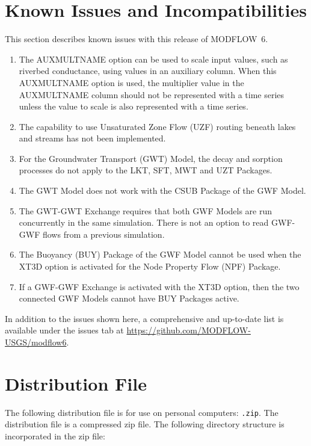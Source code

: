 \documentclass[11pt,twoside,twocolumn]{usgsreport}
\begin{document}
\section{Known Issues and Incompatibilities}
This section describes known issues with this release of MODFLOW~6.  

\begin{enumerate}

\item
The AUXMULTNAME option can be used to scale input values, such as riverbed conductance, using values in an auxiliary column.  When this AUXMULTNAME option is used, the multiplier value in the AUXMULTNAME column should not be represented with a time series unless the value to scale is also represented with a time series.  

\item
The capability to use Unsaturated Zone Flow (UZF) routing beneath lakes and streams has not been implemented.

\item
For the Groundwater Transport (GWT) Model, the decay and sorption processes do not apply to the LKT, SFT, MWT and UZT Packages.

\item
The GWT Model does not work with the CSUB Package of the GWF Model.  

\item
The GWT-GWT Exchange requires that both GWF Models are run concurrently in the same simulation.  There is not an option to read GWF-GWF flows from a previous simulation.

\item
The Buoyancy (BUY) Package of the GWF Model cannot be used when the XT3D option is activated for the Node Property Flow (NPF) Package.

\item
If a GWF-GWF Exchange is activated with the XT3D option, then the two connected GWF Models cannot have BUY Packages active.

\end{enumerate}

In addition to the issues shown here, a comprehensive and up-to-date list is available under the issues tab at \url{https://github.com/MODFLOW-USGS/modflow6}.


\section{Distribution File}
The following distribution file is for use on personal computers: \texttt{\modflowversion.zip}.  The distribution file is a compressed zip file. The following directory structure is incorporated in the zip file:
\end{document}
